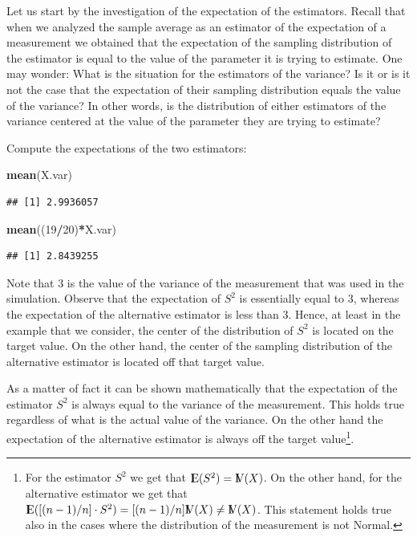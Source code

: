 \documentclass[]{krantz}
\makeatletter
\newenvironment{Shaded}{\begin{snugshade}}{\end{snugshade}}
\newcommand{\KeywordTok}[1]{\textcolor[rgb]{0.13,0.29,0.53}{\textbf{#1}}}
\newcommand{\DecValTok}[1]{\textcolor[rgb]{0.00,0.00,0.81}{#1}}
\newcommand{\OperatorTok}[1]{\textcolor[rgb]{0.81,0.36,0.00}{\textbf{#1}}}
\newcommand{\NormalTok}[1]{#1}
\newcommand{\Expec}{{\rm I\kern-.3em E}}
\newcommand{\Var}{{\rm I\kern-.3em V}}
\newenvironment{kframe}{%
\medskip{}
\setlength{\fboxsep}{.8em}
 \def\at@end@of@kframe{}%
 \ifinner\ifhmode%
  \def\at@end@of@kframe{\end{minipage}}%
  \begin{minipage}{\columnwidth}%
 \fi\fi%
 \def\FrameCommand##1{\hskip\@totalleftmargin \hskip-\fboxsep
 \colorbox{shadecolor}{##1}\hskip-\fboxsep
     \hskip-\linewidth \hskip-\@totalleftmargin \hskip\columnwidth}%
 \MakeFramed {\advance\hsize-\width
   \@totalleftmargin\z@ \linewidth\hsize
   \@setminipage}}%
 {\par\unskip\endMakeFramed%
 \at@end@of@kframe}
\renewenvironment{Shaded}{\begin{kframe}}{\end{kframe}}
\theoremstyle{definition}
\theoremstyle{definition}
\theoremstyle{definition}
\theoremstyle{remark}
\makeatother
\begin{document}
Let us start by the investigation of the expectation of the estimators.
Recall that when we analyzed the sample average as an estimator of the
expectation of a measurement we obtained that the expectation of the
sampling distribution of the estimator is equal to the value of the
parameter it is trying to estimate. One may wonder: What is the
situation for the estimators of the variance? Is it or is it not the
case that the expectation of their sampling distribution equals the
value of the variance? In other words, is the distribution of either
estimators of the variance centered at the value of the parameter they
are trying to estimate?

Compute the expectations of the two estimators:

\begin{Shaded}
\begin{Highlighting}[]
\KeywordTok{mean}\NormalTok{(X.var)}
\end{Highlighting}
\end{Shaded}

\begin{verbatim}
## [1] 2.9936057
\end{verbatim}

\begin{Shaded}
\begin{Highlighting}[]
\KeywordTok{mean}\NormalTok{((}\DecValTok{19}\OperatorTok{/}\DecValTok{20}\NormalTok{)}\OperatorTok{*}\NormalTok{X.var)}
\end{Highlighting}
\end{Shaded}

\begin{verbatim}
## [1] 2.8439255
\end{verbatim}

Note that 3 is the value of the variance of the measurement that was
used in the simulation. Observe that the expectation of \(S^2\) is
essentially equal to 3, whereas the expectation of the alternative
estimator is less than 3. Hence, at least in the example that we
consider, the center of the distribution of \(S^2\) is located on the
target value. On the other hand, the center of the sampling distribution
of the alternative estimator is located off that target value.

As a matter of fact it can be shown mathematically that the expectation
of the estimator \(S^2\) is always equal to the variance of the
measurement. This holds true regardless of what is the actual value of
the variance. On the other hand the expectation of the alternative
estimator is always off the target value\footnote{For the estimator
  \(S^2\) we get that \(\Expec(S^2) = \Var(X)\). On the other hand, for
  the alternative estimator we get that
  \(\Expec([(n-1)/n]\cdot S^2) = [(n-1)/n]\Var(X) \not = \Var(X)\). This
  statement holds true also in the cases where the distribution of the
  measurement is not Normal.}.
\end{document}
